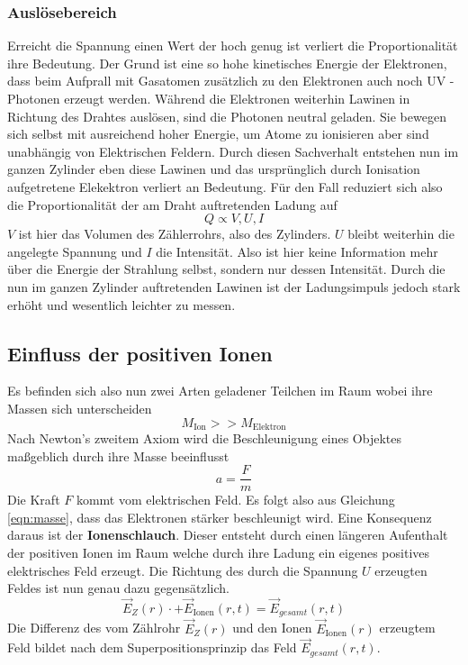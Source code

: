 \subsubsection{Auslösebereich}
Erreicht die Spannung einen Wert der hoch genug ist verliert die Proportionalität ihre Bedeutung. 
Der Grund ist eine so hohe kinetisches Energie der Elektronen, dass beim Aufprall mit Gasatomen zusätzlich zu den Elektronen auch noch UV - Photonen erzeugt werden. 
Während die Elektronen weiterhin Lawinen 
in Richtung des Drahtes auslösen, sind die Photonen neutral geladen. Sie bewegen sich selbst mit ausreichend hoher Energie, um Atome zu ionisieren aber sind unabhängig von 
Elektrischen Feldern. Durch diesen Sachverhalt entstehen nun im ganzen Zylinder eben diese Lawinen und das ursprünglich durch Ionisation aufgetretene Elekektron verliert an Bedeutung.
Für den Fall reduziert sich also die Proportionalität der am Draht auftretenden Ladung auf
\begin{equation*}
\label{eqn:prop3}
Q \propto V, U, I
\end{equation*}
$V$ ist hier das Volumen des Zählerrohrs, also des Zylinders. $U$ bleibt weiterhin die angelegte Spannung und $I$ die Intensität.
Also ist hier keine Information mehr über die Energie der Strahlung selbst, sondern nur dessen Intensität.
Durch die nun im ganzen Zylinder auftretenden Lawinen ist der Ladungsimpuls jedoch stark erhöht und wesentlich leichter zu messen.

\subsection{Einfluss der positiven Ionen}
Es befinden sich also nun zwei Arten geladener Teilchen im Raum wobei ihre Massen sich unterscheiden
\begin{equation}
\label{eqn:masse}
M_\text{Ion} >> M_\text{Elektron}
\end{equation}
Nach Newton's zweitem Axiom wird die Beschleunigung eines Objektes maßgeblich durch ihre Masse beeinflusst
\begin{equation}
\label{eqn:masse}
a= \frac{F}{m}
\end{equation}
Die Kraft $F$ kommt vom elektrischen Feld. Es folgt also aus Gleichung \eqref{eqn:masse}, dass das Elektronen stärker beschleunigt wird. Eine Konsequenz daraus ist der \textbf{Ionenschlauch}. Dieser entsteht
durch einen längeren Aufenthalt der positiven Ionen im Raum welche durch ihre Ladung ein eigenes positives elektrisches Feld erzeugt. Die Richtung des durch die Spannung $U$ erzeugten Feldes ist nun genau dazu gegensätzlich.
\begin{equation*}
\label{eqn:Felder}
\vec{E}_Z(r)\cdot + \vec{E}_\text{Ionen}(r,t) = \vec{E}_{gesamt}(r,t) 
\end{equation*}
Die Differenz des vom Zählrohr $\vec{E}_Z(r)$ und den Ionen $\vec{E}_\text{Ionen}(r) $ erzeugtem Feld bildet nach dem Superpositionsprinzip das Feld $\vec{E}_{gesamt}(r,t)$.
